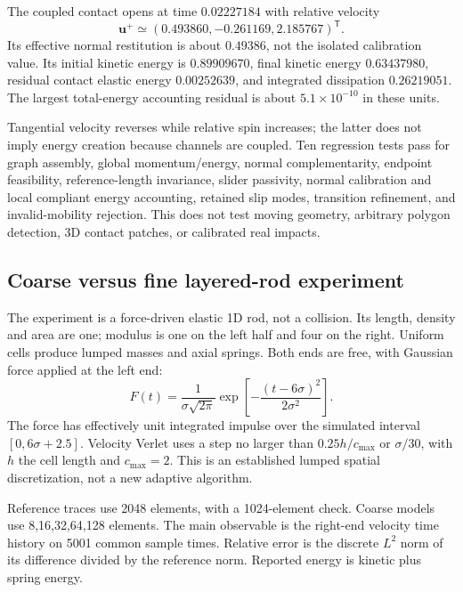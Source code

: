 \documentclass[11pt,a4paper]{article}
\newcommand{\bv}[1]{\bm{#1}}\newcommand{\inertia}{\mathbb I}
\begin{document}
The coupled contact opens at time $0.02227184$ with relative velocity
\[\bv u^+\simeq(0.493860,-0.261169,2.185767)^{\mathsf T}.\]
Its effective normal restitution is about $0.49386$, not the isolated calibration value. Its initial kinetic energy is $0.89909670$, final kinetic energy $0.63437980$, residual contact elastic energy $0.00252639$, and integrated dissipation $0.26219051$. The largest total-energy accounting residual is about $5.1\times10^{-10}$ in these units.

Tangential velocity reverses while relative spin increases; the latter does not imply energy creation because channels are coupled. Ten regression tests pass for graph assembly, global momentum/energy, normal complementarity, endpoint feasibility, reference-length invariance, slider passivity, normal calibration and local compliant energy accounting, retained slip modes, transition refinement, and invalid-mobility rejection. This does not test moving geometry, arbitrary polygon detection, 3D contact patches, or calibrated real impacts.

\subsection{Coarse versus fine layered-rod experiment}
The experiment is a force-driven elastic 1D rod, not a collision. Its length, density and area are one; modulus is one on the left half and four on the right. Uniform cells produce lumped masses and axial springs. Both ends are free, with Gaussian force applied at the left end:
\begin{equation}
F(t)=\frac{1}{\sigma\sqrt{2\pi}}
\exp\left[-\frac{(t-6\sigma)^2}{2\sigma^2}\right].
\end{equation}
The force has effectively unit integrated impulse over the simulated interval $[0,6\sigma+2.5]$. Velocity Verlet uses a step no larger than $0.25h/c_{\max}$ or $\sigma/30$, with $h$ the cell length and $c_{\max}=2$. This is an established lumped spatial discretization, not a new adaptive algorithm.

Reference traces use 2048 elements, with a 1024-element check. Coarse models use 8,16,32,64,128 elements. The main observable is the right-end velocity time history on 5001 common sample times. Relative error is the discrete $L^2$ norm of its difference divided by the reference norm. Reported energy is kinetic plus spring energy.
\end{document}

